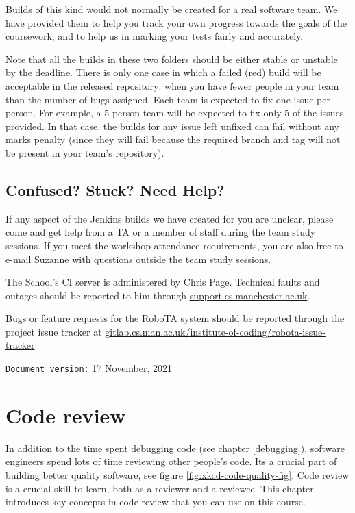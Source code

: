 \documentclass[
]{book}
\begin{document}
Builds of this kind would not normally be created for a real software team. We have provided them to help you track your own progress towards the goals of the coursework, and to help us in marking your tests fairly and accurately.

Note that all the builds in these two folders should be either stable or unstable by the deadline. There is only one case in which a failed (red) build will be acceptable in the released repository: when you have fewer people in your team than the number of bugs assigned. Each team is expected to fix one issue per person. For example, a 5 person team will be expected to fix only 5 of the issues provided. In that case, the builds for any issue left unfixed can fail without any marks penalty (since they will fail because the required branch and tag will not be present in your team's repository).

\hypertarget{confused}{%
\section{Confused? Stuck? Need Help?}\label{confused}}

If any aspect of the Jenkins builds we have created for you are unclear, please come and get help from a TA or a member of staff during the team study sessions. If you meet the workshop attendance requirements, you are also free to e-mail Suzanne with questions outside the team study sessions.

The School's CI server is administered by Chris Page. Technical faults and outages should be reported to him through \href{https://support.cs.manchester.ac.uk}{support.cs.manchester.ac.uk}.

Bugs or feature requests for the RoboTA system should be reported through the project issue tracker at \href{https://gitlab.cs.man.ac.uk/institute-of-coding/robota-issue-tracker}{gitlab.cs.man.ac.uk/institute-of-coding/robota-issue-tracker}

\texttt{Document\ version:} 17 November, 2021

\hypertarget{reviewing}{%
\chapter{Code review}\label{reviewing}}

In addition to the time spent debugging code (see chapter \ref{debugging}), software engineers spend lots of time reviewing other people's code. Its a crucial part of building better quality software, see figure \ref{fig:xkcd-code-quality-fig}. Code review is a crucial skill to learn, both as a reviewer and a reviewee. This chapter introduces key concepts in code review that you can use on this course.
\end{document}
